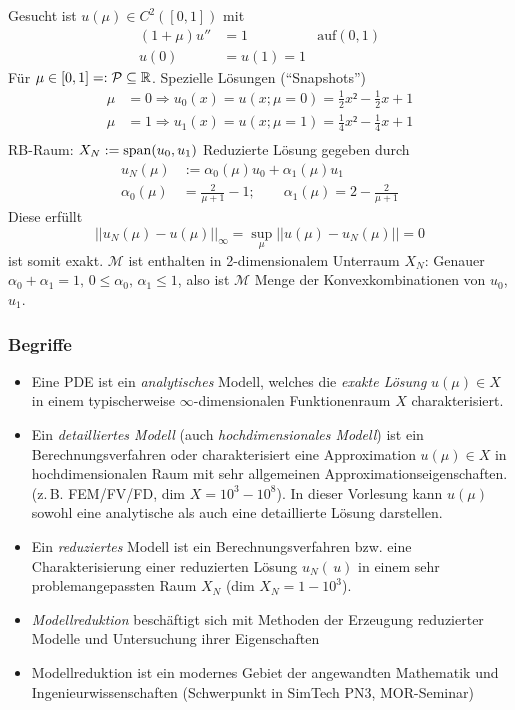 \begin{bsp}
	Gesucht ist $u(\mu) \in C^2([0,1])$ mit 
	\begin{align*}
		(1 + \mu) u'' &= 1 & \text{auf} (0,1) \\
		u(0) &= u(1) = 1
	\end{align*}
	Für $\mu \in [0,1] =: \mathcal{P} \subseteq \mathbb{R}$. Spezielle Lösungen ("`Snapshots"')
	\begin{align*}
		\mu &= 0 \Rightarrow u_0(x) = u(x; \mu = 0) = \frac{1}{2} x² - \frac{1}{2} x + 1 \\
		\mu &= 1 \Rightarrow u_1(x) = u(x; \mu = 1) = \frac{1}{4} x² - \frac{1}{4} x + 1 \\
	\end{align*}
	RB-Raum: $X_N := \operatorname{span}(u_0,u_1)$
	Reduzierte Lösung gegeben durch
	\begin{align*}
		u_N(\mu) &:= \alpha_0(\mu)u_0 + \alpha_1(\mu)u_1 \\
		\alpha_0 (\mu) &= \frac{2}{\mu + 1} - 1 ; \qquad \alpha_1(\mu) = 2 - \frac{2}{\mu + 1}
	\end{align*}
	Diese erfüllt 
	\[
	 ||u_N(\mu) - u(\mu)||_{\infty} = \sup\limits_{\mu} ||u(\mu) - u_N(\mu)|| = 0
	\]
	ist somit exakt. $\mathcal{M}$ ist enthalten in 2-dimensionalem Unterraum $X_N$: Genauer $\alpha_0 + \alpha_1 = 1,\, 0 \le \alpha_0,\, \alpha_1 \le 1$, also ist $\mathcal{M}$ Menge der Konvexkombinationen von $u_0$, $u_1$.
\end{bsp}

\subsubsection*{Begriffe}
\label{Begriffe}

\begin{itemize}
	\item Eine PDE ist ein \emph{analytisches} Modell, welches die \emph{exakte Lösung} $u(\mu) \in X$ in einem typischerweise $\infty$-dimensionalen Funktionenraum $X$ charakterisiert.
	\item Ein \emph{detailliertes Modell} (auch \emph{hochdimensionales Modell}) ist ein Berechnungsverfahren oder charakterisiert eine Approximation $u(\mu) \in X$ in hochdimensionalen Raum mit sehr allgemeinen Approximationseigenschaften. (z.\,B. FEM/FV/FD, dim $X = 10^3 - 10^8$).
	In dieser Vorlesung kann $u(\mu)$ sowohl eine analytische als auch eine detaillierte Lösung darstellen.
	\item Ein \emph{reduziertes} Modell ist ein Berechnungsverfahren bzw. eine Charakterisierung einer reduzierten Lösung $u_N(\,u)$ in einem sehr problemangepassten Raum $X_N$ (dim $X_N = 1 - 10^3$).
	\item \emph{Modellreduktion} beschäftigt sich mit Methoden der Erzeugung reduzierter Modelle und Untersuchung ihrer Eigenschaften
	\item Modellreduktion ist ein modernes Gebiet der angewandten Mathematik und Ingenieurwissenschaften (Schwerpunkt in SimTech PN3, MOR-Seminar)
\end{itemize}

